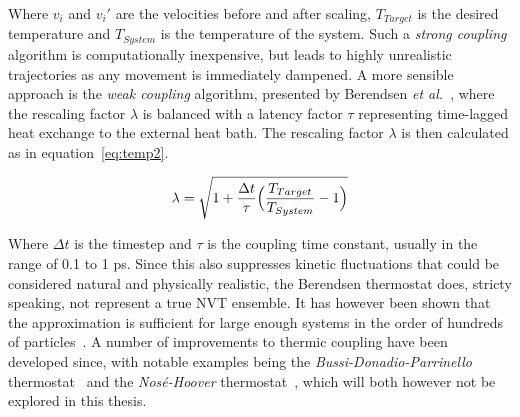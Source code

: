 \documentclass[11pt]{article}
\begin{document}
\bigskip

\noindent Where $v_i$ and $v_i'$ are the velocities before and after scaling, $T_{Target}$ is the desired temperature and $T_{System}$ is the temperature of the system. Such a \textit{strong coupling} algorithm is computationally inexpensive, but leads to highly unrealistic trajectories as any movement is immediately dampened. A more sensible approach is the \textit{weak coupling} algorithm, presented by Berendsen \textit{et al.}~\cite{Berendsen1984}, where the rescaling factor $\lambda$ is balanced with a latency factor $\tau$ representing time-lagged heat exchange to the external heat bath. The rescaling factor $\lambda$ is then calculated as in equation~\ref{eq:temp2}.

\begin{equation}
  \lambda = \sqrt{1 + \frac{\Delta t}{\tau}\Bigl(\frac{T_{Target}}{T_{System}} - 1\Bigr)}
  \label{eq:temp2}
\end{equation}

\bigskip

\noindent Where $\Delta t$ is the timestep and $\tau$ is the coupling time constant, usually in the range of 0.1 to 1 ps. Since this also suppresses kinetic fluctuations that could be considered natural and physically realistic, the Berendsen thermostat does, stricty speaking, not represent a true NVT ensemble. It has however been shown that the approximation is sufficient for large enough systems in the order of hundreds of particles~\cite{Morishita2000}. A number of improvements to thermic coupling have been developed since, with notable examples being the \textit{Bussi-Donadio-Parrinello} thermostat~\cite{Bussi2007} and the \textit{Nosé-Hoover} thermostat~\cite{Hoover1996}, which will both however not be explored in this thesis.


\end{document}
